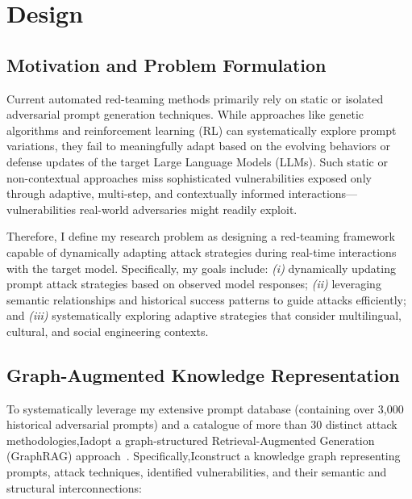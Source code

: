 \documentclass[manuscript,screen,review]{acmart}
\begin{document}
\section{Design}

\subsection{Motivation and Problem Formulation}

Current automated red-teaming methods primarily rely on static or isolated adversarial prompt generation techniques. While approaches like genetic algorithms and reinforcement learning (RL) can systematically explore prompt variations, they fail to meaningfully adapt based on the evolving behaviors or defense updates of the target Large Language Models (LLMs). Such static or non-contextual approaches miss sophisticated vulnerabilities exposed only through adaptive, multi-step, and contextually informed interactions—vulnerabilities real-world adversaries might readily exploit.

Therefore, I define my research problem as designing a red-teaming framework capable of dynamically adapting attack strategies during real-time interactions with the target model. Specifically, my goals include: 
\textit{(i)} dynamically updating prompt attack strategies based on observed model responses; 
\textit{(ii)} leveraging semantic relationships and historical success patterns to guide attacks efficiently; and 
\textit{(iii)} systematically exploring adaptive strategies that consider multilingual, cultural, and social engineering contexts.

\subsection{Graph-Augmented Knowledge Representation}

To systematically leverage my extensive prompt database (containing over 3,000 historical adversarial prompts) and a catalogue of more than 30 distinct attack methodologies,Iadopt a graph-structured Retrieval-Augmented Generation (GraphRAG) approach~\cite{GraphRAG}. Specifically,Iconstruct a knowledge graph representing prompts, attack techniques, identified vulnerabilities, and their semantic and structural interconnections:
\end{document}
